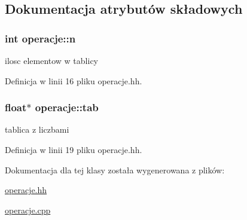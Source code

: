\subsection{\-Dokumentacja atrybutów składowych}
\hypertarget{classoperacje_aec7cc301d8822128d918aa1f9c7e1db2}{
\subsubsection[{n}]{\setlength{\rightskip}{0pt plus 5cm}int {\bf operacje\-::n}}}\label{classoperacje_aec7cc301d8822128d918aa1f9c7e1db2}


ilosc elementow w tablicy 



\-Definicja w linii 16 pliku operacje.\-hh.

\hypertarget{classoperacje_ad23bc418eebc9b493a5494ffd9358dd0}{
\subsubsection[{tab}]{\setlength{\rightskip}{0pt plus 5cm}float$\ast$ {\bf operacje\-::tab}}}\label{classoperacje_ad23bc418eebc9b493a5494ffd9358dd0}


tablica z liczbami 



\-Definicja w linii 19 pliku operacje.\-hh.



\-Dokumentacja dla tej klasy została wygenerowana z plików\-:\begin{DoxyCompactItemize}
\item 
\hyperlink{operacje_8hh}{operacje.\-hh}\item 
\hyperlink{operacje_8cpp}{operacje.\-cpp}\end{DoxyCompactItemize}
